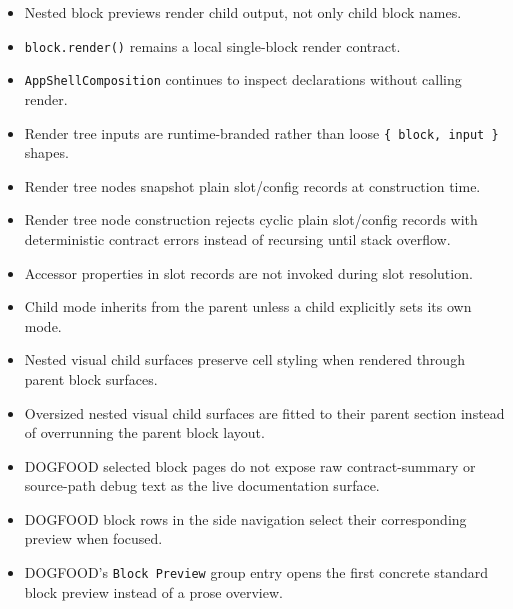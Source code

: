 \begin{itemize}
\tightlist
\item
  Nested block previews render child output, not only child block names.
\item
  \texttt{b\allowbreak{}l\allowbreak{}o\allowbreak{}c\allowbreak{}k\allowbreak{}.\allowbreak{}r\allowbreak{}e\allowbreak{}n\allowbreak{}d\allowbreak{}e\allowbreak{}r\allowbreak{}(\allowbreak{})} remains a local single-block render contract.
\item
  \texttt{A\allowbreak{}p\allowbreak{}p\allowbreak{}S\allowbreak{}h\allowbreak{}e\allowbreak{}l\allowbreak{}l\allowbreak{}C\allowbreak{}o\allowbreak{}m\allowbreak{}p\allowbreak{}o\allowbreak{}s\allowbreak{}i\allowbreak{}t\allowbreak{}i\allowbreak{}o\allowbreak{}n} continues to inspect declarations without calling render.
\item
  Render tree inputs are runtime-branded rather than loose \texttt{\{\allowbreak{} \allowbreak{}b\allowbreak{}l\allowbreak{}o\allowbreak{}c\allowbreak{}k\allowbreak{},\allowbreak{} \allowbreak{}i\allowbreak{}n\allowbreak{}p\allowbreak{}u\allowbreak{}t\allowbreak{} \allowbreak{}\}} shapes.
\item
  Render tree nodes snapshot plain slot/config records at construction time.
\item
  Render tree node construction rejects cyclic plain slot/config records with deterministic contract errors instead of recursing until stack overflow.
\item
  Accessor properties in slot records are not invoked during slot resolution.
\item
  Child mode inherits from the parent unless a child explicitly sets its own mode.
\item
  Nested visual child surfaces preserve cell styling when rendered through parent block surfaces.
\item
  Oversized nested visual child surfaces are fitted to their parent section instead of overrunning the parent block layout.
\item
  DOGFOOD selected block pages do not expose raw contract-summary or source-path debug text as the live documentation surface.
\item
  DOGFOOD block rows in the side navigation select their corresponding preview when focused.
\item
  DOGFOOD's \texttt{B\allowbreak{}l\allowbreak{}o\allowbreak{}c\allowbreak{}k\allowbreak{} \allowbreak{}P\allowbreak{}r\allowbreak{}e\allowbreak{}v\allowbreak{}i\allowbreak{}e\allowbreak{}w} group entry opens the first concrete standard block preview instead of a prose overview.

\end{itemize}
